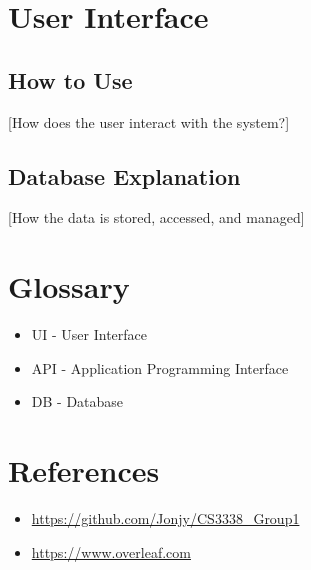 \documentclass[12pt]{article}
\begin{document}
\section{User Interface}
\subsection{How to Use}
[How does the user interact with the system?]

\subsection{Database Explanation}
[How the data is stored, accessed, and managed]

\section{Glossary}
\begin{itemize}
  \item UI - User Interface
  \item API - Application Programming Interface
  \item DB - Database
\end{itemize}

\section{References}
\begin{itemize}
  \item \url{https://github.com/Jonjy/CS3338_Group1}
  \item \url{https://www.overleaf.com}
\end{itemize}
\end{document}
